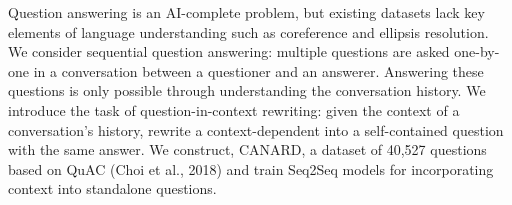 Question answering is an AI-complete problem, but existing datasets lack key elements of language understanding such as coreference and ellipsis resolution. We consider sequential question answering: multiple questions are asked one-by-one in a conversation between a questioner
and an answerer. Answering these questions is only possible through understanding the conversation history. We introduce the task of question-in-context rewriting: given the context of a conversation's history, rewrite a context-dependent into a self-contained question with the same answer. We construct, CANARD, a dataset of 40,527 questions based on QuAC (Choi et al., 2018) and train Seq2Seq models for incorporating context into standalone questions.